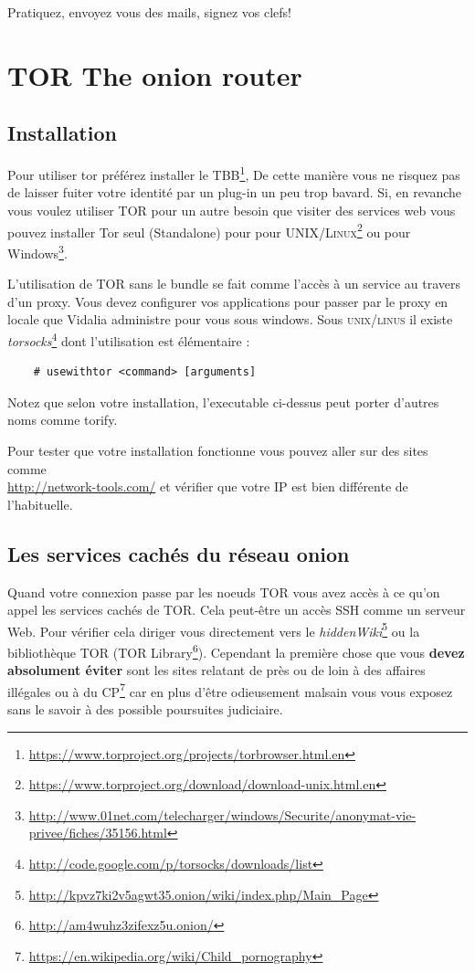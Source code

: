 \documentclass[a4paper]{article}
\begin{document}
Pratiquez, envoyez vous des mails, signez vos clefs!

\section{TOR The onion router}
\subsection{Installation}
Pour utiliser tor préférez installer le \textsc{TBB}\protect\footnote{\url{https://www.torproject.org/projects/torbrowser.html.en}},
De cette manière vous ne risquez pas de laisser fuiter votre identité par un plug-in un peu trop bavard.
Si, en revanche vous voulez utiliser \textsc{TOR} pour un autre besoin que visiter des services web vous pouvez installer 
Tor seul (Standalone) pour pour \textsc{UNIX/Linux}\protect\footnote{\url{https://www.torproject.org/download/download-unix.html.en}}
ou pour Windows\protect\footnote{\url{http://www.01net.com/telecharger/windows/Securite/anonymat-vie-privee/fiches/35156.html}}.

L'utilisation de TOR sans le bundle se fait comme l'accès à un service au travers d'un proxy. Vous devez configurer vos applications
pour passer par le proxy en locale que Vidalia administre pour vous sous windows. Sous \textsc{unix/linus} il existe \emph{torsocks}\protect\footnote{\url{http://code.google.com/p/torsocks/downloads/list}}
dont l'utilisation est élémentaire :

\begin{verbatim}
    # usewithtor <command> [arguments]
\end{verbatim}
Notez que selon votre installation, l'executable ci-dessus peut porter d'autres noms comme torify.

Pour tester que votre installation fonctionne vous pouvez aller sur des sites comme\\
\url{http://network-tools.com/} et vérifier que votre IP est bien différente de l'habituelle.

\subsection{Les services cachés du réseau onion}
Quand votre connexion passe par les noeuds \textsc{TOR} vous avez accès à ce qu'on
appel les services cachés de \textsc{TOR}. Cela peut-être un accès SSH comme un
serveur Web. Pour vérifier cela diriger vous directement vers le
\emph{hiddenWiki}\footnote{\url{http://kpvz7ki2v5agwt35.onion/wiki/index.php/Main_Page}}
ou la bibliothèque TOR (TOR Library\footnote{\url{http://am4wuhz3zifexz5u.onion/}}).
Cependant la première chose que vous \textbf{devez absolument éviter} sont les sites relatant de
près ou de loin à des affaires illégales ou à du CP\protect\footnote{\url{https://en.wikipedia.org/wiki/Child_pornography}}
car en plus d'être odieusement malsain vous vous exposez sans le savoir à des possible poursuites judiciaire.
\\
\end{document}
